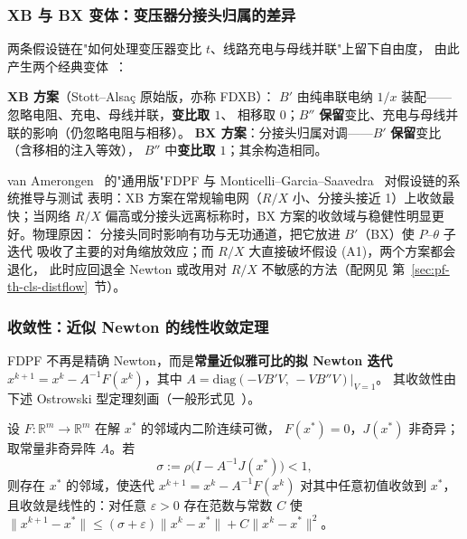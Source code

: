 \subsubsection{XB 与 BX 变体：变压器分接头归属的差异}

两条假设链在"如何处理变压器变比 $t$、线路充电与母线并联"上留下自由度，
由此产生两个经典变体~\cite{cls:stott,cls:vanamerongen}：

\begin{definition}[XB 与 BX 方案]\label{sec:pf-th-cls-def-xbbx}
\textbf{XB 方案}（Stott--Alsa\c{c} 原始版，亦称 FDXB）：
$B'$ 由纯串联电纳 $1/x$ 装配——忽略电阻、充电、母线并联，\textbf{变比取 $1$}、
相移取 $0$；$B''$ \textbf{保留}变比、充电与母线并联的影响（仍忽略电阻与相移）。
\textbf{BX 方案}：分接头归属对调——$B'$ \textbf{保留}变比（含移相的注入等效），
$B''$ 中\textbf{变比取 $1$}；其余构造相同。
\end{definition}

\begin{remark}[变体选择的经验结论]\label{sec:pf-th-cls-rem-xbbx}
van Amerongen~\cite{cls:vanamerongen} 的"通用版"FDPF 与
Monticelli--Garcia--Saavedra~\cite{cls:monticelli} 对假设链的系统推导与测试
表明：XB 方案在常规输电网（$R/X$ 小、分接头接近 1）上收敛最快；当网络
$R/X$ 偏高或分接头远离标称时，BX 方案的收敛域与稳健性明显更好。物理原因：
分接头同时影响有功与无功通道，把它放进 $B'$（BX）使 $P$--$\theta$ 子迭代
吸收了主要的对角缩放效应；而 $R/X$ 大直接破坏假设 (A1)，两个方案都会退化，
此时应回退全 Newton 或改用对 $R/X$ 不敏感的方法（配网见
第~\ref{sec:pf-th-cls-distflow}~节）。
\end{remark}

\subsubsection{收敛性：近似 Newton 的线性收敛定理}

FDPF 不再是精确 Newton，而是\textbf{常量近似雅可比的拟 Newton 迭代}
$x^{k+1}=x^k-A^{-1}F(x^k)$，其中 $A=\mathrm{diag}(-V B' V,\,-V B'' V)\big|_{V=1}$。
其收敛性由下述 Ostrowski 型定理刻画（一般形式见~\cite{cls:ortega}）。

\begin{theorem}[常量近似雅可比迭代的局部线性收敛]\label{sec:pf-th-cls-thm-fdpf}
设 $F:\mathbb R^m\to\mathbb R^m$ 在解 $x^*$ 的邻域内二阶连续可微，
$F(x^*)=0$，$J(x^*)$ 非奇异；取常量非奇异阵 $A$。若
\begin{equation}
\sigma:=\rho\bigl(I-A^{-1}J(x^*)\bigr)<1,
\end{equation}
则存在 $x^*$ 的邻域，使迭代 $x^{k+1}=x^k-A^{-1}F(x^k)$ 对其中任意初值收敛到
$x^*$，且收敛是线性的：对任意 $\varepsilon>0$ 存在范数与常数 $C$ 使
$\lVert x^{k+1}-x^*\rVert\le(\sigma+\varepsilon)\lVert x^k-x^*\rVert
+C\lVert x^k-x^*\rVert^2$。
\end{theorem}

